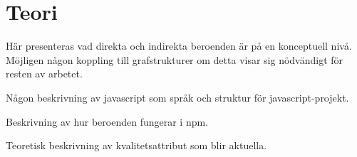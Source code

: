 \section{Teori}
\label{sec:joel_o-theory}
Här presenteras vad direkta och indirekta beroenden är på en konceptuell nivå. Möjligen någon koppling till grafstrukturer om detta visar sig nödvändigt för resten av arbetet.

Någon beskrivning av javascript som språk och struktur för javascript-projekt.

Beskrivning av hur beroenden fungerar i npm.

Teoretisk beskrivning av kvalitetsattribut som blir aktuella.
